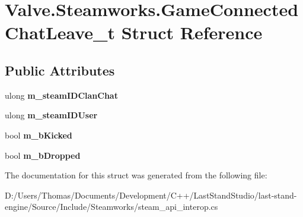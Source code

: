 \hypertarget{structValve_1_1Steamworks_1_1GameConnectedChatLeave__t}{}\section{Valve.\+Steamworks.\+Game\+Connected\+Chat\+Leave\+\_\+t Struct Reference}
\label{structValve_1_1Steamworks_1_1GameConnectedChatLeave__t}
\subsection*{Public Attributes}
\begin{DoxyCompactItemize}
\item 
\hypertarget{structValve_1_1Steamworks_1_1GameConnectedChatLeave__t_a5185a4c0e684d783fbf8358ff4be3898}{}ulong {\bfseries m\+\_\+steam\+I\+D\+Clan\+Chat}\label{structValve_1_1Steamworks_1_1GameConnectedChatLeave__t_a5185a4c0e684d783fbf8358ff4be3898}

\item 
\hypertarget{structValve_1_1Steamworks_1_1GameConnectedChatLeave__t_a9fdb17b2af91745605a8801c1707f2da}{}ulong {\bfseries m\+\_\+steam\+I\+D\+User}\label{structValve_1_1Steamworks_1_1GameConnectedChatLeave__t_a9fdb17b2af91745605a8801c1707f2da}

\item 
\hypertarget{structValve_1_1Steamworks_1_1GameConnectedChatLeave__t_aeb3063088b28c90d45cc6eeb5271ba0b}{}bool {\bfseries m\+\_\+b\+Kicked}\label{structValve_1_1Steamworks_1_1GameConnectedChatLeave__t_aeb3063088b28c90d45cc6eeb5271ba0b}

\item 
\hypertarget{structValve_1_1Steamworks_1_1GameConnectedChatLeave__t_a5d2a8d66712d6f3ebf1e89bd4052f973}{}bool {\bfseries m\+\_\+b\+Dropped}\label{structValve_1_1Steamworks_1_1GameConnectedChatLeave__t_a5d2a8d66712d6f3ebf1e89bd4052f973}

\end{DoxyCompactItemize}


The documentation for this struct was generated from the following file\+:\begin{DoxyCompactItemize}
\item 
D\+:/\+Users/\+Thomas/\+Documents/\+Development/\+C++/\+Last\+Stand\+Studio/last-\/stand-\/engine/\+Source/\+Include/\+Steamworks/steam\+\_\+api\+\_\+interop.\+cs\end{DoxyCompactItemize}
